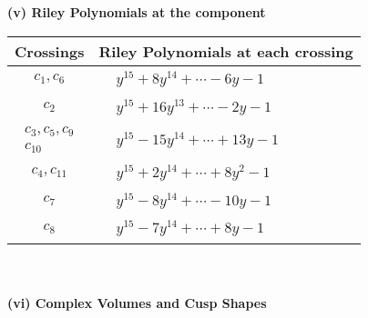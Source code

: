 \documentclass[1p]{elsarticle_modified}
\theoremstyle{definition}
\begin{document}
\newpage\renewcommand{\arraystretch}{1}
\flushleft \textbf{(v) Riley Polynomials at the component}\newline \\
\begin{tabular}{m{50pt}|m{274pt}}
Crossings & \hspace{64pt}Riley Polynomials at each crossing \\
\hline $$\begin{aligned}c_{1},c_{6}\end{aligned}$$&$\begin{aligned}
&y^{15}+8 y^{14}+\cdots-6 y-1
\end{aligned}$\\
\hline $$\begin{aligned}c_{2}\end{aligned}$$&$\begin{aligned}
&y^{15}+16 y^{13}+\cdots-2 y-1
\end{aligned}$\\
\hline $$\begin{aligned}c_{3},c_{5},c_{9}\\c_{10}\end{aligned}$$&$\begin{aligned}
&y^{15}-15 y^{14}+\cdots+13 y-1
\end{aligned}$\\
\hline $$\begin{aligned}c_{4},c_{11}\end{aligned}$$&$\begin{aligned}
&y^{15}+2 y^{14}+\cdots+8 y^2-1
\end{aligned}$\\
\hline $$\begin{aligned}c_{7}\end{aligned}$$&$\begin{aligned}
&y^{15}-8 y^{14}+\cdots-10 y-1
\end{aligned}$\\
\hline $$\begin{aligned}c_{8}\end{aligned}$$&$\begin{aligned}
&y^{15}-7 y^{14}+\cdots+8 y-1
\end{aligned}$\\
\hline
\end{tabular}\\~\\
\newpage\flushleft \textbf{(vi) Complex Volumes and Cusp Shapes}
\end{document}
